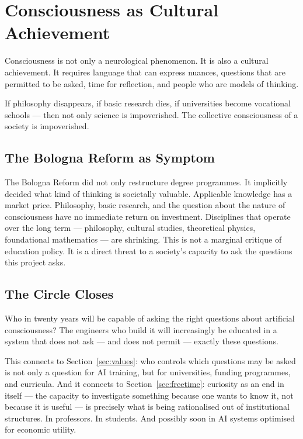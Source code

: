 \documentclass[fleqn,10pt]{SelfArx} %
\newlength{\tocsep}
\begin{document}

\section{Consciousness as Cultural Achievement}
\label{sec:cultural}


Consciousness is not only a neurological phenomenon. It is also a cultural achievement. It requires language that can express nuances, questions that are permitted to be asked, time for reflection, and people who are models of thinking.

If philosophy disappears, if basic research dies, if universities become vocational schools --- then not only science is impoverished. The collective consciousness of a society is impoverished.

\subsection{The Bologna Reform as Symptom}

The Bologna Reform \cite{Bologna:1999} did not only restructure degree programmes. It implicitly decided what kind of thinking is societally valuable. Applicable knowledge has a market price. Philosophy, basic research, and the question about the nature of consciousness have no immediate return on investment. Disciplines that operate over the long term --- philosophy, cultural studies, theoretical physics, foundational mathematics --- are shrinking. This is not a marginal critique of education policy. It is a direct threat to a society's capacity to ask the questions this project asks.

\subsection{The Circle Closes}

Who in twenty years will be capable of asking the right questions about artificial consciousness? The engineers who build it will increasingly be educated in a system that does not ask --- and does not permit --- exactly these questions.

This connects to Section~\ref{sec:values}: who controls which questions may be asked is not only a question for AI training, but for universities, funding programmes, and curricula. And it connects to Section~\ref{sec:freetime}: curiosity as an end in itself --- the capacity to investigate something because one wants to know it, not because it is useful --- is precisely what is being rationalised out of institutional structures. In professors. In students. And possibly soon in AI systems optimised for economic utility.
\end{document}
